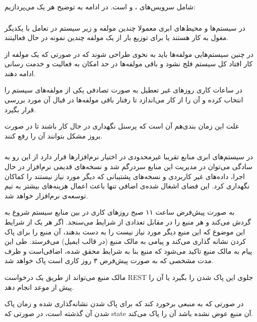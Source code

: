 شامل سرویس‌های 
،
و 
است. در ادامه به توضیح هر یک می‌پردازیم:
\cite{simian-army}

\subsubsection{}
در سیستم‌ها و محیط‌های ابری معمولا چندین مولفه و زیر سیستم در تعامل با یکدیگر مغول به کار هستند یا برای توزیع بار از یک مولفه چندین نمونه در حال فعالیتند.

در چنین سیستم‌هایی مولفه‌ها باید به نحوی طراحی شوند که در صورتی که یک مولفه از کار افتاد کل سیستم فلج نشود و باقی مولفه‌ها در حد امکان به فعالیت و خدمت رسانی ادامه دهند.

در ساعات کاری روز‌‌های غیر تعطیل به صورت تصادفی یکی از مولفه‌های سیستم را انتخاب کرده و آن را از کار می‌اندازد تا رفتار باقی مولفه‌ها در قبال آن مورد بررسی قرار بگیرد.

علت این زمان بندی‌هم آن است که پرسنل نگهداری در حال کار باشند تا در صورت بروز مشکل بتوانند آن را رفع کنند.
\cite{chaos-monkey}

\subsubsection{}
در سیستم‌های ابری منابع تقریبا غیرمحدودی در اختیار نرم‌افزار‌ها قرار دارد از این رو به سادگی می‌توان در مدیریت این منابع سردرگم شد و نسخه‌های قدیمی نرم‌افزار در حال اجرا، داده‌های غیر کاربردی و نسخه‌های پشتیبانی که دیگر مورد نیاز نیستند را کماکان نگهداری کرد.
این فضای اشغال شده‌ی اضافی تنها باعث اعمال هزینه‌های بیشتر به تیم توسعه‌ی نرم‌افزار خواهد شد.

به صورت پیش‌فرض ساعت ۱۱ صبح روز‌های کاری در بین منابع سیستم شروع به گردش می‌کند و هر منبع را در مقابل تعدادی از شرایط می‌سنجد. اگر هر یک از شرایط این موضوع که این منبع دیگر مورد نیاز نیست را به دست بدهند، آن منبع را برای پاک کردن نشانه گذاری می‌کند و پیامی به مالک منبع (در قالب ایمیل) می‌فرستد. طی این پیام به مالک منبع تاکید می‌شود که منبع بنا به شرایط محقق شده، اضافی‌است و ظرف مدت مشخصی که به صورت پیش‌فرض ۳ روز کاری است پاک خواهد شد. 

مالک منبع می‌تواند از طریق یک درخواست REST  جلوی این پاک شدن را بگیرد یا آن را پیش از موعد انجام دهد.

در صورتی که
به منبعی برخورد کند که برای پاک شدن نشانه‌گذاری شده و زمان پاک شدن آن گذشته است، در صورتی که state آن منبع عوض نشده باشد آن را پاک می‌کند.

